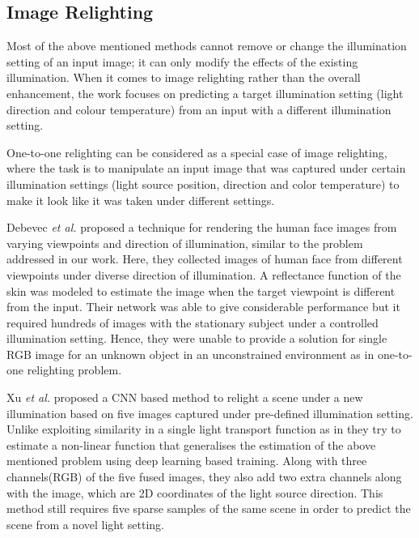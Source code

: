 \documentclass[runningheads]{llncs}
\newcommand{\etal}{\textit{et al. }}
\begin{document}
\subsection{Image Relighting}
\label{sec:Image Relighting}
\par
Most of the above mentioned methods cannot remove or change the illumination
setting of an input image; it can only modify the effects of the existing illumination. When it comes to image relighting rather than the overall enhancement,
the work focuses on predicting a target illumination setting (light direction and
colour temperature) from an input with a different illumination setting.
\par
One-to-one relighting can be considered as a special case of image relighting,
where the task is to manipulate an input image that was captured under certain
illumination settings (light source position, direction and color temperature) to
make it look like it was taken under different settings.
\par
Debevec \etal proposed a technique \cite{reflectance_human_face} for rendering the human face images from varying
viewpoints and direction of illumination, similar to the problem addressed in
our work. Here, they collected images of human face from different viewpoints
under diverse direction of illumination. A reflectance function of the skin was
modeled to estimate the image when the target viewpoint is different from the
input. Their network was able to give considerable performance but it required
hundreds of images with the stationary subject under a controlled illumination setting. Hence,
they were unable to provide a solution for single RGB image for an unknown
object in an unconstrained environment as in one-to-one relighting problem.
\par
Xu \etal proposed a CNN based method \cite{relightnet_a} to relight a scene under a new illumination based on five images captured under pre-defined illumination setting. Unlike exploiting similarity in a single light transport function as in \cite{reflectance_human_face} they try to estimate a non-linear function that generalises the estimation of the above mentioned problem using deep learning based training. Along with three channels(RGB)
of the five fused images, they also add two extra channels along with the image, which are
2D coordinates of the light source direction. This method still requires five sparse
samples of the same scene in order to predict the scene from a novel light setting.
\end{document}
